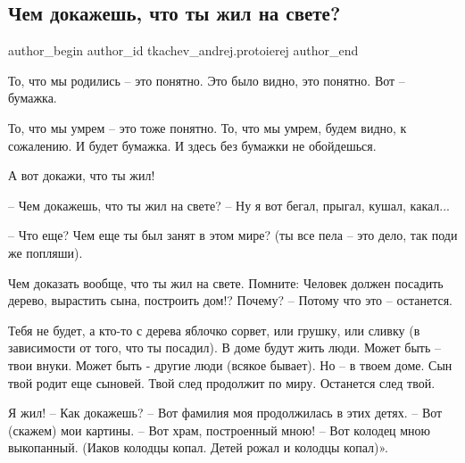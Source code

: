  
 
 
 
 
 
\subsection{Чем докажешь, что ты жил на свете?}
\label{sec:10_02_2022.yz.tkachev_andrej.protoierej.1.chem_dokazhesh_chto_zhil_na_svete}
 
\ifcmt
 author_begin
   author_id tkachev_andrej.protoierej
 author_end
\fi

То, что мы родились – это понятно. Это было видно, это понятно. Вот – бумажка. 

То, что мы умрем – это тоже понятно. То, что мы умрем, будем видно, к
сожалению. И будет бумажка. И здесь без бумажки не обойдешься.


А вот докажи, что ты жил! 

– Чем докажешь, что ты жил на свете? – Ну я вот бегал, прыгал, кушал, какал...

– Что еще? Чем еще ты был занят в этом мире? (ты все пела – это дело, так поди
же попляши).

Чем доказать вообще, что ты жил на свете. Помните: Человек должен посадить
дерево, вырастить сына, построить дом!? Почему? – Потому что это – останется. 

Тебя не будет, а кто-то с дерева яблочко сорвет, или грушку, или сливку (в
зависимости от того, что ты посадил). В доме будут жить люди. Может быть – твои
внуки. Может быть - другие люди (всякое бывает). Но – в твоем доме. Сын твой
родит еще сыновей. Твой след продолжит по миру. Останется след твой. 

Я жил! – Как докажешь? – Вот фамилия моя продолжилась в этих детях. – Вот
(скажем) мои картины. – Вот храм, построенный мною! – Вот колодец мною
выкопанный. (Иаков колодцы копал. Детей рожал и колодцы копал)».

